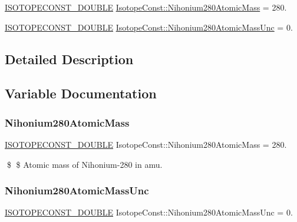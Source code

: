 \begin{DoxyCompactItemize}
\item 
\mbox{\hyperlink{group___isotope_const-_macros_ga8f45a7272ce02c0b4c65c44636ed719a}{I\+S\+O\+T\+O\+P\+E\+C\+O\+N\+S\+T\+\_\+\+D\+O\+U\+B\+LE}} \mbox{\hyperlink{group___isotope_const-_nihonium-_nh280_ga64017b93deafc445546f3b194be917e2}{Isotope\+Const\+::\+Nihonium280\+Atomic\+Mass}} = 280.
\item 
\mbox{\hyperlink{group___isotope_const-_macros_ga8f45a7272ce02c0b4c65c44636ed719a}{I\+S\+O\+T\+O\+P\+E\+C\+O\+N\+S\+T\+\_\+\+D\+O\+U\+B\+LE}} \mbox{\hyperlink{group___isotope_const-_nihonium-_nh280_gacc67082bdf65988c8d634ad273316c82}{Isotope\+Const\+::\+Nihonium280\+Atomic\+Mass\+Unc}} = 0.
\end{DoxyCompactItemize}


\subsection{Detailed Description}


\subsection{Variable Documentation}
\mbox{\label{group___isotope_const-_nihonium-_nh280_ga64017b93deafc445546f3b194be917e2}} 
\subsubsection{\texorpdfstring{Nihonium280\+Atomic\+Mass}{Nihonium280AtomicMass}}
{\footnotesize\ttfamily \mbox{\hyperlink{group___isotope_const-_macros_ga8f45a7272ce02c0b4c65c44636ed719a}{I\+S\+O\+T\+O\+P\+E\+C\+O\+N\+S\+T\+\_\+\+D\+O\+U\+B\+LE}} Isotope\+Const\+::\+Nihonium280\+Atomic\+Mass = 280.}

\$ \$ Atomic mass of Nihonium-\/280 in amu. \mbox{\label{group___isotope_const-_nihonium-_nh280_gacc67082bdf65988c8d634ad273316c82}} 
\subsubsection{\texorpdfstring{Nihonium280\+Atomic\+Mass\+Unc}{Nihonium280AtomicMassUnc}}
{\footnotesize\ttfamily \mbox{\hyperlink{group___isotope_const-_macros_ga8f45a7272ce02c0b4c65c44636ed719a}{I\+S\+O\+T\+O\+P\+E\+C\+O\+N\+S\+T\+\_\+\+D\+O\+U\+B\+LE}} Isotope\+Const\+::\+Nihonium280\+Atomic\+Mass\+Unc = 0.}

